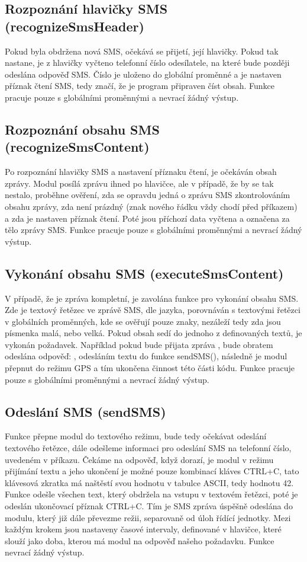 \documentclass[FM,BP]{tulthesis}  %
\begin{document}
\subsection{Rozpoznání hlavičky SMS (recognizeSmsHeader)}
Pokud byla obdržena nová SMS, očekává se přijetí, její hlavičky. Pokud tak nastane, je z hlavičky vyčteno telefonní číslo odesílatele, na které bude později odeslána odpověď SMS. Číslo je uloženo do globální proměnné a je nastaven příznak čtení SMS, tedy značí, že je program připraven číst obsah. Funkce pracuje pouze s globálními proměnnými a nevrací žádný výstup.

\subsection{Rozpoznání obsahu SMS (recognizeSmsContent)}
Po rozpoznání hlavičky SMS a nastavení příznaku čtení, je očekáván obsah zprávy. Modul posílá zprávu ihned po hlavičce, ale v případě, že by se tak nestalo, proběhne ověření, zda se opravdu jedná o zprávu SMS zkontrolováním obsahu zprávy, zda není prázdný (znak nového řádku vždy chodí před příkazem) a zda je nastaven příznak čtení. Poté jsou příchozí data vyčtena a označena za tělo zprávy SMS. Funkce pracuje pouze s globálními proměnnými a nevrací žádný výstup.

\subsection{Vykonání obsahu SMS (executeSmsContent)}
V případě, že je zpráva kompletní, je zavolána funkce pro vykonání obsahu SMS. Zde je textový řetězec ve zprávě SMS, dle jazyka, porovnáván s textovými řetězci v globálních proměnných, kde se ověřují pouze znaky, nezáleží tedy zda jsou písmenka malá, nebo velká. Pokud obsah sedí do jednoho z definovaných textů, je vykonán požadavek. Například pokud bude přijata zpráva , bude obratem odeslána odpověď: , odesláním textu do funkce sendSMS(), následně je modul přepnut do režimu GPS a tím ukončena činnost této části kódu. Funkce pracuje pouze s globálními proměnnými a nevrací žádný výstup.

\subsection{Odeslání SMS (sendSMS)}
Funkce přepne modul do textového režimu, bude tedy očekávat odeslání textového řetězce, dále odešleme informaci pro odeslání SMS na telefonní číslo, uvedeném v příkazu. Čekáme na odpověď, když dorazí, je modul v režimu přijímání textu a jeho ukončení je možné pouze kombinací kláves CTRL+C, tato klávesová zkratka má naštěstí svou hodnotu v tabulce ASCII, tedy hodnotu 42. Funkce odešle všechen text, který obdržela na vstupu v textovém řetězci, poté je odeslán ukončovací příznak CTRL+C. Tím je SMS zpráva úspěšně odeslána do modulu, který již dále převezme režii, separovaně od úloh řídící jednotky. Mezi každým krokem jsou nastaveny časové intervaly, definované v hlavičce, které slouží jako doba, kterou má modul na odpověď našeho požadavku. Funkce nevrací žádný výstup.
\end{document}

